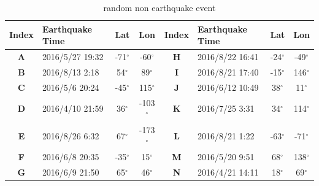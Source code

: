 \documentclass[3p,authoryear,preprint,12pt]{elsarticle}
\begin{document}
\begin{table}[htbp]
	\caption{random non earthquake event}
	\label{tab:random non earthquake event}
	\centering
	\begin{tabular}{clcc|clcc}
		\toprule
		\textbf{Index}&\textbf{Earthquake Time}               & \textbf{Lat}  & \textbf{Lon}  &\textbf{Index}&\textbf{Earthquake Time}               & \textbf{Lat}  & \textbf{Lon}  \\ \midrule
		\textbf{A}&2016/5/27 19:32 & -71$^\circ$ & -60$^\circ$  &\textbf{H} &2016/8/22 16:41  & -24$^\circ$ & -49$^\circ$ \\
		\textbf{B}&2016/8/13 2:18  & 54$^\circ$  & 89$^\circ$   &\textbf{I}& 2016/8/21 17:40 & -15$^\circ$ & 146$^\circ$ \\
		\textbf{C}&2016/5/6 20:24   & -45$^\circ$ &115$^\circ$ & \textbf{J}&2016/6/12 10:49  & 38$^\circ$  & 11$^\circ$  \\
		\textbf{D}&2016/4/10 21:59  & 36$^\circ$  & -103$^\circ$ &\textbf{K} &2016/7/25 3:31   & 34$^\circ$  & 114$^\circ$ \\
		\textbf{E}&2016/8/26 6:32   & 67$^\circ$  & -173$^\circ$ & \textbf{L}&2016/8/21 1:22   & -63$^\circ$ & -71$^\circ$ \\
		\textbf{F}&2016/6/8 20:35   & -35$^\circ$ &15$^\circ$ & \textbf{M}&2016/5/20 9:51   & 68$^\circ$  & 138$^\circ$ \\
		\textbf{G}&2016/6/9 21:50  & 65$^\circ$  & 46$^\circ$   &\textbf{N}& 2016/4/21 14:11  & 18$^\circ$  & 69$^\circ$  \\ \bottomrule
	\end{tabular}
\end{table}
\end{document}

